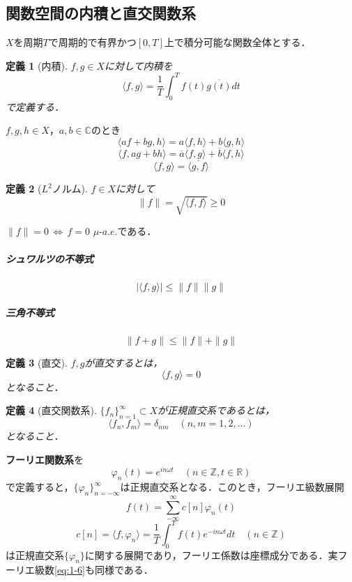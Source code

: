 \documentclass[dvipdfmx,a4j,10pt]{jsarticle}
\theoremstyle{mystyle1}
\theoremstyle{mystyle3}
\theoremstyle{mystyle4}
\theoremstyle{mystyle6}
\theoremstyle{mystyle2}
\newtheorem{dfn*}{定義}
\theoremstyle{mystyle5}
\begin{document}
\subsection{関数空間の内積と直交関数系}


$X$を周期$T$で周期的で有界かつ$[0,T]$上で積分可能な関数全体とする．

\begin{dfn*}[内積]
	$f,g\in X$に対して内積を
	\[
		\langle f,g \rangle=\frac{1}{T}\int_0^T f(t)\overline{g(t)}dt
	\]
	で定義する．
\end{dfn*}

$f,g,h\in X$，$a,b\in\mathbb{C}$のとき
\[
	\langle af+bg,h\rangle=a\langle f,h\rangle +b\langle g,h\rangle
\]
\[
	\langle f,ag+bh\rangle=\overline{a}\langle f,g\rangle +\overline{b}\langle f,h\rangle
\]
\[
	\langle f,g\rangle=\overline{\langle g,f\rangle}
\]

\begin{dfn*}[$L^2$ノルム]
	$f\in X$に対して
	\[
		\|f\|=\sqrt{\langle f,f\rangle}\geq 0
	\]
\end{dfn*}

$\|f\|=0\,\Leftrightarrow\,f=0$ $\mu$-$a.e.$である．

\subparagraph{シュワルツの不等式}

\begin{equation}\label{eq:1-18}
	|\langle f,g\rangle|\leq\|f\|\|g\|
\end{equation}

\subparagraph{三角不等式}

\begin{equation}\label{eq:1-19}
	\|f+g\|\leq\|f\|+\|g\|
\end{equation}

\begin{dfn*}[直交]
	$f,g$が直交するとは，
	\[
		\langle f,g\rangle=0
	\]
	となること．
\end{dfn*}

\begin{dfn*}[直交関数系]
	$\{f_n\}_{n=1}^\infty \subset X$が正規直交系であるとは，
	\[
		\langle f_n,f_m\rangle=\delta_{nm}\quad(n,m=1,2,\ldots)
	\]
	となること．
\end{dfn*}

\textbf{フーリエ関数系}を
\[
	\varphi_n(t)=e^{in\omega t}\quad(n\in\mathbb{Z},t\in\mathbb{R})
\]
で定義すると，$\{\varphi_n\}_{n=-\infty}^\infty$は正規直交系となる．このとき，フーリエ級数展開
\[
	f(t)=\sum_{-\infty}^\infty c[n]\varphi_n(t)
\]
\[
	c[n]=\langle f,\varphi_n \rangle=\frac{1}{T}\int_0^T f(t)e^{-in\omega t}dt\quad(n\in\mathbb{Z})
\]
は正規直交系$\{\varphi_n\}$に関する展開であり，フーリエ係数は座標成分である．実フーリエ級数\eqref{eq:1-6}も同様である．
\end{document}
